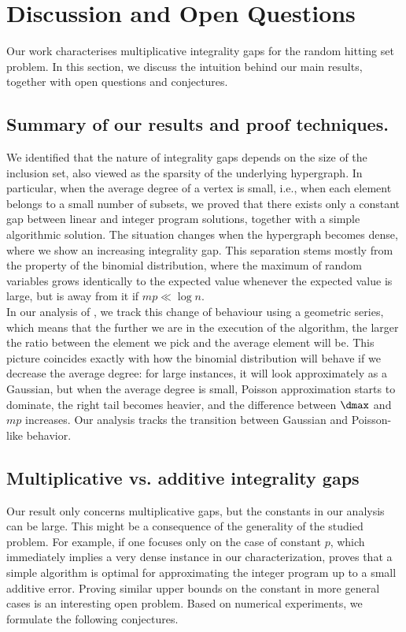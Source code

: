 \section{Discussion and Open Questions}\label{sec:discussion}
Our work characterises multiplicative integrality gaps for the random hitting set problem. In this section, we discuss the intuition behind our main results, together with open questions and conjectures.
\subsection{Summary of our results and proof techniques.}
We identified that the nature of integrality gaps depends on the size of the inclusion set, also viewed as the sparsity of the underlying hypergraph. 
In particular, when the average degree of a vertex is small, i.e., when each element belongs to a small number of subsets, we proved that there exists only a constant gap between linear and integer program solutions, together with a simple algorithmic solution. 
The situation changes when the hypergraph becomes dense, where we show an increasing integrality gap. 
This separation stems mostly from the property of the binomial distribution, where the maximum of random variables grows identically to the expected value whenever the expected value is large, but is away from it if \(mp \ll \log n\).\\
\noindent
 In our analysis of \bgreedy, we track this change of behaviour using a geometric series, which means that the further we are in the execution of the algorithm, the larger the ratio between the element we pick and the average element will be. 
 This picture coincides exactly with how the binomial distribution will behave if we decrease the average degree: for large instances, it will look approximately as a Gaussian, but when the average degree is small, Poisson approximation starts to dominate, the right tail becomes heavier, and the difference between \(\dmax\) and \(mp\) increases. 
 Our analysis tracks the transition between Gaussian and Poisson-like behavior.
\subsection{Multiplicative vs. additive integrality gaps}
Our result only concerns multiplicative gaps, but the constants in our analysis can be large. This might be a consequence of the generality of the studied problem. 
For example, if one focuses only on the case of constant \(p\), which immediately implies a very dense instance in our characterization, \cite{telelis2005absolute} proves that a simple algorithm is optimal for approximating the integer program up to a small additive error. 
Proving similar upper bounds on the constant in more general cases is an interesting open problem. Based on numerical experiments, we formulate the following conjectures.

